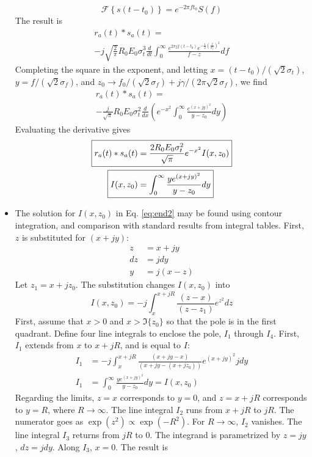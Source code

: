 \documentclass[amsmath,amssymb,aps,prd,10pt,twocolumn,showkeys]{revtex4}
\begin{document}
\begin{itemize}
\begin{equation}
\mathcal{F}\left\lbrace s(t-t_0)\right\rbrace = e^{-2\pi f t_0} S(f)
\end{equation}
The result is
\begin{multline}
r_a(t) * s_a(t) = \\ -j \sqrt{\frac{2}{\pi}} R_0 E_0 \sigma_t^3 \frac{d}{dt} \int_0^\infty \frac{e^{2\pi j f(t-t_0)} e^{-\frac{1}{2}\left(\frac{f}{\sigma_f}\right)^2}}{f-z}df
\end{multline}
Completing the square in the exponent, and letting $x = (t-t_0)/(\sqrt{2}\sigma_t)$, $y = f/(\sqrt{2}\sigma_f)$, and $z_0 \to f_0/(\sqrt{2}\sigma_f)+j \gamma/(2\pi\sqrt{2}\sigma_f)$, we find
\begin{multline}
r_a(t) * s_a(t) = \\ -\frac{j}{\sqrt{\pi}} R_0 E_0 \sigma_t^2 \frac{d}{dx} \left(e^{-x^2} \int_0^{\infty} \frac{e^{(x+jy)^2}}{y-z_0} dy \right)
\end{multline}
Evaluating the derivative gives
\begin{align}
\Aboxed{r_a(t) * s_a(t) &= \frac{2R_0 E_0 \sigma_t^2}{\sqrt{\pi}} e^{-x^2} I(x,z_0)} \label{eq:end1} \\
\Aboxed{I(x,z_0) &= \int_0^{\infty} \frac{y e^{(x+jy)^2}}{y-z_0} dy} \label{eq:end2}
\end{align}
\item The solution for $I(x,z_0)$ in Eq. \ref{eq:end2} may be found using contour integration, and comparison with standard results from integral tables.  First, $z$ is substituted for $(x+jy)$:
\begin{align}
z &= x+jy \\
dz &= j dy \\
y &= j(x-z)
\end{align}
Let $z_1 = x+jz_0$. The substitution changes $I(x,z_0)$ into
\begin{equation}
I(x,z_0) = -j \int_{x}^{x+jR} \frac{(z-x)}{(z-z_1)} e^{z^2} dz
\end{equation}
First, assume that $x>0$ and $x>\Im \lbrace z_0\rbrace$ so that the pole is in the first quadrant.  Define four line integrals to enclose the pole, $I_1$ through $I_4$.  First, $I_1$ extends from $x$ to $x+jR$, and is equal to $I$:
\begin{align}
I_1 &= -j \int_{x}^{x+jR} \frac{(x+jy-x)}{(x+jy-(x+jz_0))} e^{(x+jy)^2} j dy \\
I_1 &= \int_0^{\infty} \frac{y e^{(x+jy)^2}}{y-z_0} dy = I(x,z_0)
\end{align}
Regarding the limits, $z = x$ corresponds to $y=0$, and $z = x+jR$ corresponds to $y=R$, where $R \to \infty$.  The line integral $I_2$ runs from $x+jR$ to $jR$.  The numerator goes as $\exp(z^2) \propto \exp(-R^2)$.  For $R \to \infty$, $I_2$ vanishes.  The line integral $I_3$ returns from $jR$ to $0$.  The integrand is parametrized by $z = jy$, $dz = jdy$.  Along $I_3$, $x = 0$.  The result is

\end{itemize}
\end{document}
